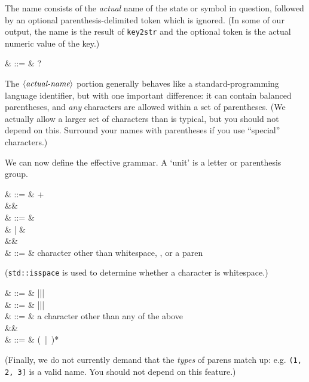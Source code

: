 The name consists of the \textsl{actual} name of the state or symbol
in question, followed by an optional parenthesis-delimited token which
is ignored. (In some of our output, the name is the result of
\texttt{key2str} and the optional token is the actual numeric value of
the key.)

\begin{grammar}
   & ::= &  \cfgsp  {}?
\end{grammar}

The $\langle\textit{actual-name}\rangle$ portion generally behaves like a standard-programming
language identifier, but with one important difference: it can contain
balanced parentheses, and \textsl{any} characters are allowed within a
set of parentheses. (We actually allow a larger set of characters than
is typical, but you should not depend on this. Surround your names
with parentheses if you use ``special'' characters.)

We can now define the effective grammar. A `unit' is a letter or
parenthesis group.

\begin{grammar}
   & ::= &  + \\
&& \\
   & ::= &   \\
                 &   | &   \\
&& \\
  & ::= &  \textrm{character other than whitespace, \term{,}, or a paren}
\end{grammar}

(\texttt{std::isspace} is used to determine whether a character is
  whitespace.)

\begin{grammar}
    & ::= &  \term{(}\cfgsp |\cfgsp \term{\{}\cfgsp |\cfgsp \term{[}\cfgsp |\cfgsp \term{$<$} \\
   & ::= &  \term{)}\cfgsp |\cfgsp \term{\}}\cfgsp |\cfgsp \term{]}\cfgsp |\cfgsp \term{$>$} \\
   & ::= &  \textrm{a character other than any of the above} \\
&& \\
  & ::= &  \cfgsp  (\ |\ )*\cfgsp  {}
\end{grammar}

(Finally, we do not currently demand that the \textsl{types} of parens
  match up: e.g. \texttt{(1, 2, 3]} is a valid name. You should not
    depend on this feature.)
